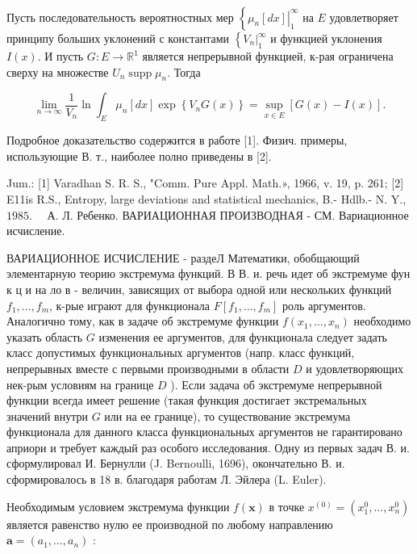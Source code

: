 \documentclass[10pt]{article}
\begin{document}
Пусть последовательность вероятностных мер $\left\{\left.\mu_{n}[d x]\right|_{1} ^{\infty}\right.$ на $E$ удовлетворяет принципу больших уклонений с константами $\left\{\left.V_{n}\right|_{1} ^{\infty}\right.$ и функцией уклонения $I(x)$. И пусть $G: E \rightarrow \mathbb{R}^{1}$ является непрерывной функцией, к-рая ограничена сверху на множестве $U_{n} \operatorname{supp} \mu_{n}$. Тогда



\[

\lim _{n \rightarrow \infty} \frac{1}{V_{n}} \ln \int_{E} \mu_{n}[d x] \exp \left\{V_{n} G(x)\right\}=\sup _{x \in E}[G(x)-I(x)] .

\]



Подробное доказательство содержится в работе [1]. Физич. примеры, использующие В. т., наиболее полно приведены в [2].



Jum.: [1] Varadhan S. R. S., "Comm. Pure Appl. Math.», 1966, v. 19, p. 261; [2] E11is R.S., Entropy, large deviations and statistical mechanics, B.- Hdlb.- N. Y., $1985 . \quad$ А. Л. Ребенко. ВАРИАЦИОННАЯ ПРОИЗВОДНАЯ - СМ. Вариационное исчисление.



ВАРИАЦИОННОЕ ИСЧИСЛЕНИЕ - раздеЛ Математики, обобщающий элементарную теорию экстремума функций. В В. и. речь идет об экстремуме фун к ц и на ло в - величин, зависящих от выбора одной или нескольких функций $f_{1}, \ldots, f_{m}$, к-рые играют для функционала $F\left[f_{1}, \ldots, f_{m}\right]$ роль аргументов. Аналогично тому, как в задаче об экстремуме функции $f\left(x_{1}, \ldots, x_{n}\right)$ необходимо указать область $G$ изменения ее аргументов, для функционала следует задать класс допустимых функциональных аргументов (напр. класс функций, непрерывных вместе с первыми производными в области $D$ и удовлетворяющих нек-рым условиям на границе $D$ ). Если задача об экстремуме непрерывной функции всегда имеет решение (такая функция достигает экстремальных значений внутри $G$ или на ее границе), то существование экстремума функционала для данного класса функциональных аргументов не гарантировано априори и требует каждый раз особого исследования. Одну из первых задач В. и. сформулировал И. Бернулли (J. Bernoulli, 1696), окончательно В. и. сформировалось в 18 в. благодаря работам Л. Эйлера (L. Euler).



Необходимым условием экстремума функции $f(\boldsymbol{x})$ в точке $x^{(0)}=\left(x_{1}^{0}, \ldots, x_{n}^{0}\right)$ является равенство нулю ее производной по любому направлению $\boldsymbol{a}=\left(a_{1}, \ldots, a_{n}\right)$ :
\end{document}
